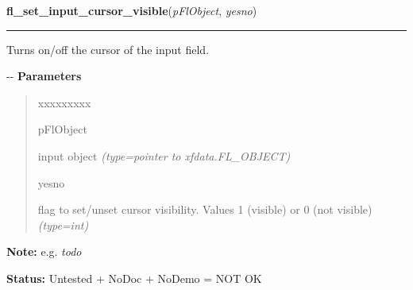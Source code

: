 \hspace{.8\funcindent}\begin{boxedminipage}{\funcwidth}

    \raggedright \textbf{fl\_set\_input\_cursor\_visible}(\textit{pFlObject}, \textit{yesno})

    \vspace{-1.5ex}

    \rule{\textwidth}{0.5\fboxrule}
\setlength{\parskip}{2ex}

Turns on/off the cursor of the input field.

-{}-
\setlength{\parskip}{1ex}
      \textbf{Parameters}
      \vspace{-1ex}

      \begin{quote}
        \begin{Ventry}{xxxxxxxxx}

          \item[pFlObject]


input object
            {\it (type=pointer to xfdata.FL\_OBJECT)}

          \item[yesno]


flag to set/unset cursor visibility. Values 1 (visible) or 0 (not
visible)
            {\it (type=int)}

        \end{Ventry}

      \end{quote}

\textbf{Note:} 
e.g. \emph{todo}


\textbf{Status:} 
Untested + NoDoc + NoDemo = NOT OK


    \end{boxedminipage}

    \label{xformslib:flinput:fl_get_input_numberoflines}

    \vspace{0.5ex}

